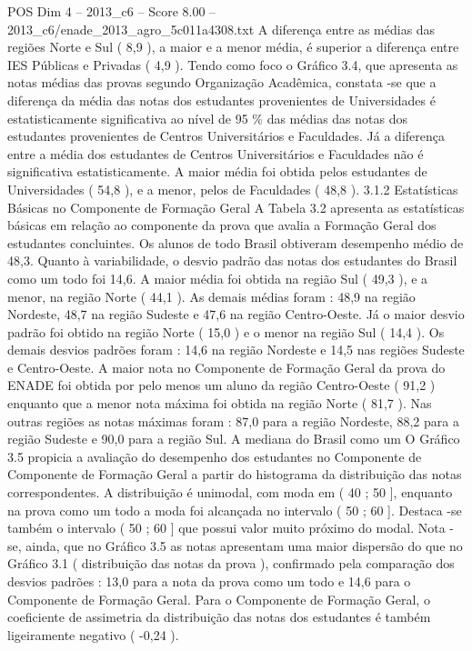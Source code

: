 \begin{textsample}{POS Dim 4 – 2013\_c6 – Score 8.00 – 2013\_c6/enade\_2013\_agro\_5c011a4308.txt}
A diferença entre as médias das regiões Norte e Sul ( 8,9 ), a maior e a menor média, é superior a diferença entre IES Públicas e Privadas ( 4,9 ).
Tendo como foco o Gráfico 3.4, que apresenta as notas médias das provas segundo Organização Acadêmica, constata -se que a diferença da média das notas dos estudantes provenientes de Universidades é estatisticamente significativa ao nível de 95 \% das médias das notas dos estudantes provenientes de Centros Universitários e Faculdades.
Já a diferença entre a média dos estudantes de Centros Universitários e Faculdades não é significativa estatisticamente.
A maior média foi obtida pelos estudantes de Universidades ( 54,8 ), e a menor, pelos de Faculdades ( 48,8 ). 3.1.2 Estatísticas Básicas no Componente de Formação Geral A Tabela 3.2 apresenta as estatísticas básicas em relação ao componente da prova que avalia a Formação Geral dos estudantes concluintes.
Os alunos de todo Brasil obtiveram desempenho médio de 48,3.
Quanto à variabilidade, o desvio padrão das notas dos estudantes do Brasil como um todo foi 14,6.
A maior média foi obtida na região Sul ( 49,3 ), e a menor, na região Norte ( 44,1 ).
As demais médias foram : 48,9 na região Nordeste, 48,7 na região Sudeste e 47,6 na região Centro-Oeste.
Já o maior desvio padrão foi obtido na região Norte ( 15,0 ) e o menor na região Sul ( 14,4 ).
Os demais desvios padrões foram : 14,6 na região Nordeste e 14,5 nas regiões Sudeste e Centro-Oeste.
A maior nota no Componente de Formação Geral da prova do ENADE foi obtida por pelo menos um aluno da região Centro-Oeste ( 91,2 ) enquanto que a menor nota máxima foi obtida na região Norte ( 81,7 ).
Nas outras regiões as notas máximas foram : 87,0 para a região Nordeste, 88,2 para a região Sudeste e 90,0 para a região Sul.
A mediana do Brasil como um O Gráfico 3.5 propicia a avaliação do desempenho dos estudantes no Componente de Componente de Formação Geral a partir do histograma da distribuição das notas correspondentes.
A distribuição é unimodal, com moda em ( 40 ; 50 ], enquanto na prova como um todo a moda foi alcançada no intervalo ( 50 ; 60 ].
Destaca -se também o intervalo ( 50 ; 60 ] que possui valor muito próximo do modal.
Nota -se, ainda, que no Gráfico 3.5 as notas apresentam uma maior dispersão do que no Gráfico 3.1 ( distribuição das notas da prova ), confirmado pela comparação dos desvios padrões : 13,0 para a nota da prova como um todo e 14,6 para o Componente de Formação Geral.
Para o Componente de Formação Geral, o coeficiente de assimetria da distribuição das notas dos estudantes é também ligeiramente negativo ( -0,24 ).

\end{textsample}
